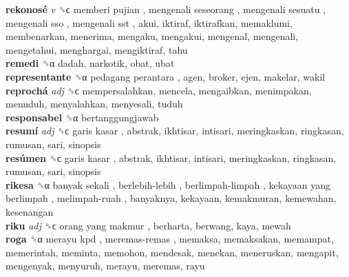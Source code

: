 \textbf{rekonosé} \emph{v}  ␝ϲ   memberi pujian ,  mengenali seseorang ,  mengenali sesuatu ,  mengenali sso ,  mengenali sst , akui, iktiraf, iktirafkan, memaklumi, membenarkan, menerima, mengaku, mengakui, mengenal, mengenali, mengetahui, menghargai, mengiktiraf, tahu  \\
\textbf{remedi} ␝α  dadah, narkotik, obat, ubat  \\
\textbf{representante} ␝α   pedagang perantara , agen, broker, ejen, makelar, wakil  \\
\textbf{reprochá} \emph{adj}  ␝ϲ  mempersalahkan, mencela, mengaibkan, menimpakan, menuduh, menyalahkan, menyesali, tuduh  \\
\textbf{responsabel} ␝α  bertanggungjawab  \\
\textbf{resumí} \emph{adj}  ␝ϲ   garis kasar , abstrak, ikhtisar, intisari, meringkaskan, ringkasan, rumusan, sari, sinopsis  \\
\textbf{resúmen} ␝ϲ   garis kasar , abstrak, ikhtisar, intisari, meringkaskan, ringkasan, rumusan, sari, sinopsis  \\
\textbf{rikesa} ␝α   banyak sekali ,  berlebih-lebih ,  berlimpah-limpah ,  kekayaan yang berlimpah ,  melimpah-ruah , banyaknya, kekayaan, kemakmuran, kemewahan, kesenangan  \\
\textbf{riku} \emph{adj}  ␝ϲ   orang yang makmur , berharta, berwang, kaya, mewah  \\
\textbf{roga} ␝α   merayu kpd ,  meremas-remas , memaksa, memaksakan, memampat, memerintah, meminta, memohon, mendesak, menekan, meneruskan, mengapit, mengenyak, menyuruh, merayu, meremas, rayu  \\
